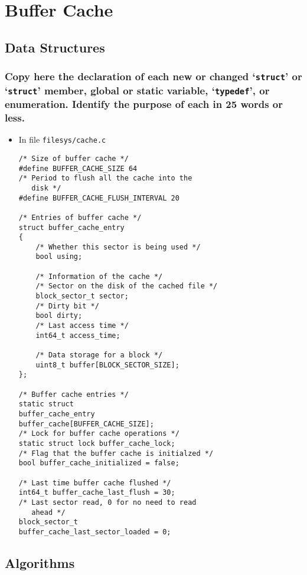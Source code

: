 \documentclass[sigconf, nonacm, balance=false, urlbreakonhyphens=true]{acmart}
\begin{document}
    \section{Buffer Cache}

        \label{Buffer Cache}

        \subsection{Data Structures}
            
            \subsubsection{Copy here the declaration of each new or changed `\texttt{struct}' or `\texttt{struct}' member, global or static variable, `\texttt{typedef}', or enumeration. Identify the purpose of each in 25 words or less. }
    
            \begin{itemize}
                \item In file \texttt{filesys/cache.c}
\begin{verbatim}
/* Size of buffer cache */
#define BUFFER_CACHE_SIZE 64
/* Period to flush all the cache into the 
   disk */
#define BUFFER_CACHE_FLUSH_INTERVAL 20

/* Entries of buffer cache */
struct buffer_cache_entry
{
    /* Whether this sector is being used */
    bool using;

    /* Information of the cache */
    /* Sector on the disk of the cached file */
    block_sector_t sector;
    /* Dirty bit */
    bool dirty;
    /* Last access time */
    int64_t access_time;

    /* Data storage for a block */
    uint8_t buffer[BLOCK_SECTOR_SIZE];
};

/* Buffer cache entries */
static struct 
buffer_cache_entry 
buffer_cache[BUFFER_CACHE_SIZE];
/* Lock for buffer cache operations */
static struct lock buffer_cache_lock;
/* Flag that the buffer cache is initialzed */
bool buffer_cache_initialized = false;

/* Last time buffer cache flushed */
int64_t buffer_cache_last_flush = 30;
/* Last sector read, 0 for no need to read 
   ahead */
block_sector_t 
buffer_cache_last_sector_loaded = 0;
\end{verbatim}
            \end{itemize}

        \subsection{Algorithms}
\end{document}
